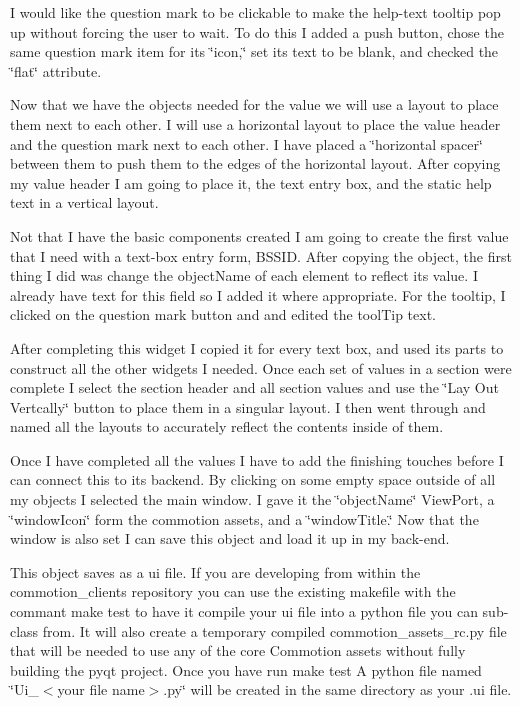 I would like the question mark to be clickable to make the help-\/text tooltip pop up without forcing the user to wait. To do this I added a push button, chose the same question mark item for its \char`\"{}icon,\char`\"{} set its text to be blank, and checked the \char`\"{}flat\char`\"{} attribute.

Now that we have the objects needed for the value we will use a layout to place them next to each other. I will use a horizontal layout to place the value header and the question mark next to each other. I have placed a \char`\"{}horizontal spacer\char`\"{} between them to push them to the edges of the horizontal layout. After copying my value header I am going to place it, the text entry box, and the static help text in a vertical layout.

Not that I have the basic components created I am going to create the first value that I need with a text-\/box entry form, B\-S\-S\-I\-D. After copying the object, the first thing I did was change the object\-Name of each element to reflect its value. I already have text for this field so I added it where appropriate. For the tooltip, I clicked on the question mark button and and edited the tool\-Tip text.

After completing this widget I copied it for every text box, and used its parts to construct all the other widgets I needed. Once each set of values in a section were complete I select the section header and all section values and use the \char`\"{}\-Lay Out Vertcally\char`\"{} button to place them in a singular layout. I then went through and named all the layouts to accurately reflect the contents inside of them.

Once I have completed all the values I have to add the finishing touches before I can connect this to its backend. By clicking on some empty space outside of all my objects I selected the main window. I gave it the \char`\"{}object\-Name\char`\"{} View\-Port, a \char`\"{}window\-Icon\char`\"{} form the commotion assets, and a \char`\"{}window\-Title.\char`\"{} Now that the window is also set I can save this object and load it up in my back-\/end.

This object saves as a ui file. If you are developing from within the commotion\-\_\-clients repository you can use the existing makefile with the commant {\ttfamily make test} to have it compile your ui file into a python file you can sub-\/class from. It will also create a temporary compiled commotion\-\_\-assets\-\_\-rc.\-py file that will be needed to use any of the core Commotion assets without fully building the pyqt project. Once you have run {\ttfamily make test} A python file named \char`\"{}\-Ui\-\_\-$<$your file name$>$.\-py\char`\"{} will be created in the same directory as your .ui file.

